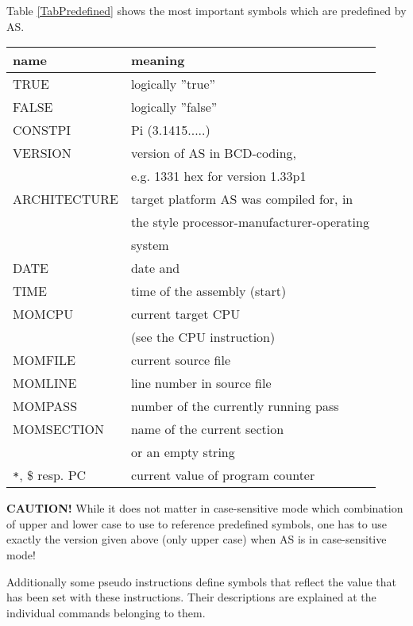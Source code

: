 \documentclass[12pt,twoside]{report}
\newcommand{\bb}[1]{{\bf #1}}
\begin{document}
Table \ref{TabPredefined} shows the most important symbols which are 
predefined by AS.
\begin{table*}[htb]
\begin{center}\begin{tabular}{|l|l|}
\hline
name          & meaning \\
\hline
\hline
TRUE          & logically ''true'' \\
FALSE         & logically ''false'' \\
CONSTPI       & Pi (3.1415.....) \\
VERSION       & version of AS in BCD-coding, \\
              & e.g. 1331 hex for version 1.33p1 \\
ARCHITECTURE  & target platform AS was compiled for, in \\
              & the style processor-manufacturer-operating \\
              & system \\
DATE          & date and \\
TIME          & time of the assembly (start) \\
MOMCPU        & current target CPU \\
              & (see the CPU instruction) \\
MOMFILE       & current source file \\
MOMLINE       & line number in source file \\
MOMPASS       & number of the currently running pass \\
MOMSECTION    & name of the current section \\
              & or an empty string \\
\verb!*!, \$ resp. PC & current value of program counter \\
\hline
\end{tabular}\end{center}
\caption{Predefined Symbols\label{TabPredefined}}
\end{table*}
\bb{CAUTION!}  While it does not matter in case-sensitive mode which
combination of upper and lower case to use to reference predefined
symbols, one has to use exactly the version given above (only upper
case) when AS is in case-sensitive mode!

Additionally some pseudo instructions define symbols that reflect the
value that has been set  with these instructions.  Their descriptions
are explained at the individual commands belonging to them.
\end{document}
